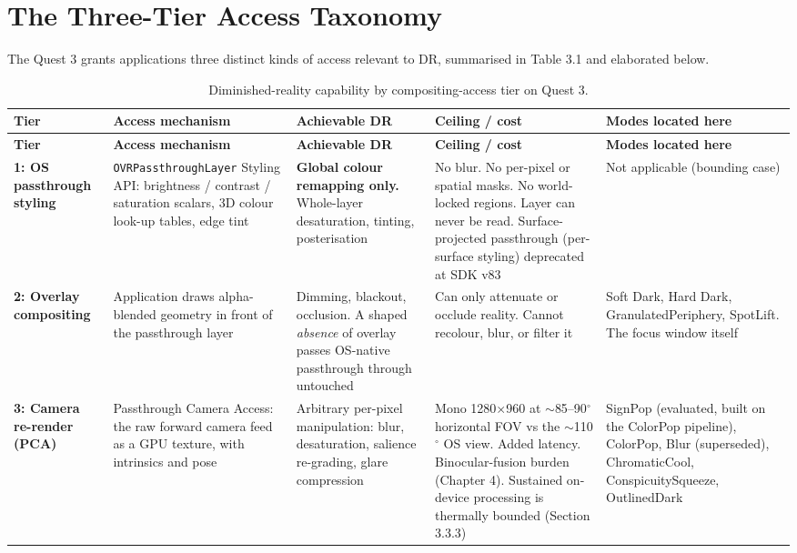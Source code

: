 
\section{The Three-Tier Access Taxonomy}

The Quest 3 grants applications three distinct kinds of access relevant to DR, summarised in
Table 3.1 and elaborated below.

\begin{longtable}{p{}p{}p{}p{}p{}}
\caption{Diminished-reality capability by compositing-access tier on Quest 3.} \\
\hline
\textbf{Tier} & \textbf{Access mechanism} & \textbf{Achievable DR} & \textbf{Ceiling / cost} & \textbf{Modes located here} \\
\hline
\endfirsthead
\hline
\textbf{Tier} & \textbf{Access mechanism} & \textbf{Achievable DR} & \textbf{Ceiling / cost} & \textbf{Modes located here} \\
\hline
\endhead
\textbf{1: OS passthrough styling} &
\verb|OVRPassthroughLayer| Styling API: brightness / contrast / saturation scalars, 3D colour look-up tables, edge tint &
\textbf{Global colour remapping only.} Whole-layer desaturation, tinting, posterisation &
No blur. No per-pixel or spatial masks. No world-locked regions. Layer can never be read. Surface-projected passthrough (per-surface styling) deprecated at SDK v83 &
Not applicable (bounding case) \\
\hline
\textbf{2: Overlay compositing} &
Application draws alpha-blended geometry in front of the passthrough layer &
Dimming, blackout, occlusion. A shaped \textit{absence} of overlay passes OS-native passthrough through untouched &
Can only attenuate or occlude reality. Cannot recolour, blur, or filter it &
Soft Dark, Hard Dark, GranulatedPeriphery, SpotLift. The focus window itself \\
\hline
\textbf{3: Camera re-render (PCA)} &
Passthrough Camera Access: the raw forward camera feed as a GPU texture, with intrinsics and pose &
Arbitrary per-pixel manipulation: blur, desaturation, salience re-grading, glare compression &
Mono 1280$\times$960 at $\sim$85–90$^{\circ}$ horizontal FOV vs the $\sim$110$^{\circ}$ OS view. Added latency. Binocular-fusion burden (Chapter 4). Sustained on-device processing is thermally bounded (Section 3.3.3) &
SignPop (evaluated, built on the ColorPop pipeline), ColorPop, Blur (superseded), ChromaticCool, ConspicuitySqueeze, OutlinedDark \\
\hline
\end{longtable}

